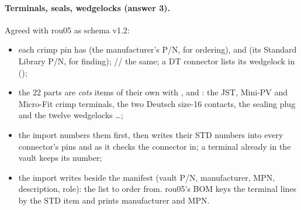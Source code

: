 \paragraph{Terminals, seals, wedgelocks (answer 3).} Agreed with rou05 as schema v1.2:
\begin{itemize}[nosep]
  \item each crimp pin has  (the manufacturer's P/N, for ordering),  and
         (its Standard Library P/N, for finding); // the
        same; a DT connector lists its wedgelock in  ();
  \item the 22 parts are \emph{cots} items of their own with ,  and
        : the JST, Mini-PV and Micro-Fit crimp terminals, the two Deutsch size-16 contacts, the
         sealing plug and the twelve wedgelocks \ldots{};
  \item the import numbers them first, then writes their STD numbers into every connector's pins and
         as it checks the connector in; a terminal already in the vault keeps its number;
  \item the import writes  beside the manifest (vault P/N, manufacturer, MPN, description,
        role): the list to order from. rou05's BOM keys the terminal lines by the STD item and prints
        manufacturer and MPN.
\end{itemize}


